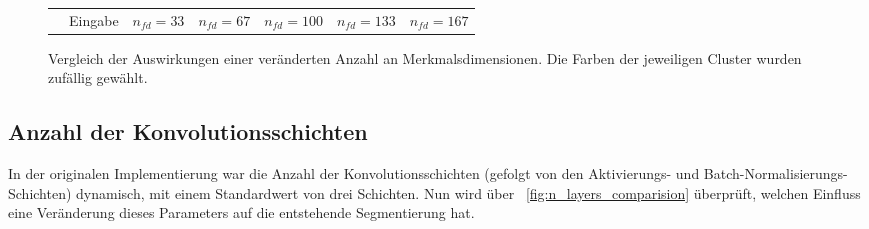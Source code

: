 \begin{figure}[h!]
\begin{tabular}{m{15pt}m{}m{}m{}m{}m{}m{}}
		&
		\hspace{2pt}\newline\centering Eingabe & 
		\hspace{2pt}\newline\centering $n_{fd}=33$ &
		\hspace{2pt}\newline\centering $n_{fd}=67$ &
		\hspace{2pt}\newline\centering $n_{fd}=100$ &
		\hspace{2pt}\newline\centering $n_{fd}=133$ &
		\hspace{2pt}\newline\centering $n_{fd}=167$ \\
	\end{tabular}
	\caption{Vergleich der Auswirkungen einer veränderten Anzahl an Merkmalsdimensionen. Die Farben der jeweiligen Cluster wurden zufällig gewählt.}
	\label{fig:fd_comparision}
\end{figure}
\fi
\subsection{Anzahl der Konvolutionsschichten}

In der originalen Implementierung war die Anzahl der Konvolutionsschichten (gefolgt von den Aktivierungs- und Batch-Normalisierungs-Schichten) dynamisch, mit einem Standardwert von drei Schichten. Nun wird über \figurename~\ref{fig:n_layers_comparision} überprüft, welchen Einfluss eine Veränderung dieses Parameters auf die entstehende Segmentierung hat.

